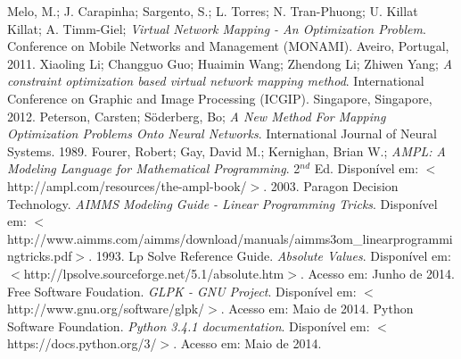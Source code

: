\documentclass{article}
\begin{document}
\begin{thebibliography}{1}
	Melo, M.; J. Carapinha; Sargento, S.; L. Torres; N. Tran-Phuong; U. Killat Killat; A. Timm-Giel;
	\emph{Virtual Network Mapping - An Optimization Problem}.
	Conference on Mobile Networks and Management (MONAMI).
	Aveiro, Portugal, 2011.
\bibitem{}
	Xiaoling Li; Changguo Guo; Huaimin Wang; Zhendong Li; Zhiwen Yang;
	\emph{A constraint optimization based virtual network mapping method}.
	International Conference on Graphic and Image Processing (ICGIP).
	Singapore, Singapore, 2012.
\bibitem{}
	Peterson, Carsten; Söderberg, Bo;
	\emph{A New Method For Mapping Optimization Problems Onto Neural Networks}.
	International Journal of Neural Systems.
	1989.
	Fourer, Robert; Gay, David M.; Kernighan, Brian W.;
	\emph{AMPL: A Modeling Language for Mathematical Programming}.
	2$^{nd}$ Ed.
	Disponível em: $<$http://ampl.com/resources/the-ampl-book/$>$.
	2003.
\bibitem{}
	Paragon Decision Technology.
	\emph{AIMMS Modeling Guide - Linear Programming Tricks}.
	Disponível em: $<$http://www.aimms.com/aimms/download/manuals/aimms3om\_linearprogrammingtricks.pdf$>$.
	1993.
\bibitem{}
	Lp Solve Reference Guide.
	\emph{Absolute Values}.
	Disponível em: $<$http://lpsolve.sourceforge.net/5.1/absolute.htm$>$.
	Acesso em: Junho de 2014.
	Free Software Foudation.
	\emph{GLPK - GNU Project}.
	Disponível em: $<$http://www.gnu.org/software/glpk/$>$.
	Acesso em: Maio de 2014.
	Python Software Foundation.
	\emph{Python 3.4.1 documentation}.
	Disponível em: $<$https://docs.python.org/3/$>$.
	Acesso em: Maio de 2014.

\end{thebibliography}
\end{document}
